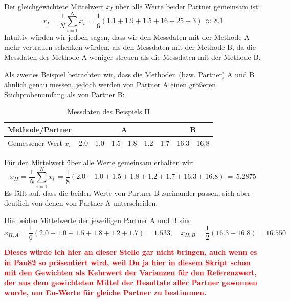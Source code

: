 Der gleichgewichtete Mittelwert $\bar x_I$ über alle Werte beider Partner gemeinsam ist:
 \begin{equation}
 \bar x_I = \frac{1}{N} \sum_{i=1}^N x_i \, = \frac{1}{6}\left( 1.1 + 1.9 + 1.5 + 16 + 25 + 3 \right) \, \approx \, 8.1
 \end{equation}
 Intuitiv würden wir jedoch sagen, dass wir den Messdaten mit der Methode A
 mehr vertrauen schenken würden, als den Messdaten mit der Methode B, da die 
 Messdaten der Methode A weniger streuen als die Messdaten mit der Methode B.

 Als zweites Beispiel betrachten wir, dass die Methoden (bzw. Partner) A und B ähnlich
 genau messen, jedoch werden von Partner A einen größeren Stichprobenumfang
 als von Partner B:

 
 \begin{table}[!htb]
 	\caption{Messdaten des Beispiels II}
 	\begin{center}
 		\begin{tabular}{l| rrrrrr |rr}
 			\hline 
 			Methode/Partner & \multicolumn{6}{c}{A} \vline & \multicolumn{2}{c}{B} \\ \hline
 			Gemessener Wert $x_i$ & 2.0 & 1.0 & 1.5 & 1.8 & 1.2 & 1.7 
 			& 16.3 & 16.8\\ \hline
 		\end{tabular}
 	\end{center}
 	\label{tab:Beispiel_II}
 \end{table}
Für den Mittelwert über alle Werte gemeinsam erhalten wir:
 \begin{equation}
 \bar x_{II} = \frac{1}{N} \sum_{i=1}^N x_i \, = \frac{1}{8}\left( 2.0 + 1.0 + 1.5 + 1.8 + 1.2 + 1.7 + 16.3 + 16.8 \right) \, = \, 5.2875
\label{eq:einfachesMittelII}
 \end{equation}
Es fällt auf, dass die beiden Werte von Partner B zueinander passen, sich aber deutlich von denen von Partner A unterscheiden.

Die beiden Mittelwerte der jeweiligen Partner A und B sind
 \begin{equation}
 \bar x_{II,A} = \frac{1}{6}\left( 2.0 + 1.0 + 1.5 + 1.8 + 1.2 + 1.7 \right) = 1.533, 
\quad \bar x_{II,B} = \frac{1}{2}\left( 16.3 + 16.8 \right) = 16.550
 \label{eq:Mittelwerte_x_II_A_B}
 \end{equation}

\textcolor{red}{\textbf{Dieses würde ich hier an dieser Stelle gar nicht bringen, auch wenn es in Pau82 
so präsentiert wird, weil Du ja hier in diesem Skript schon mit den Gewichten als Kehrwert
der Varianzen für den Referenzwert, der aus dem gewichteten Mittel der Resultate aller Partner
gewonnen wurde, um En-Werte für gleiche Partner zu bestimmen.}}


